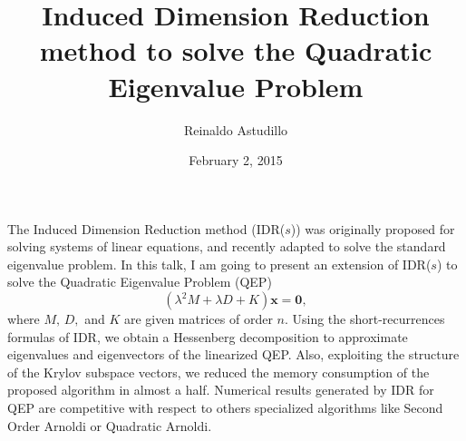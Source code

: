 \documentclass{article}
\title{Induced Dimension Reduction method to solve the Quadratic Eigenvalue Problem}
\author{Reinaldo Astudillo}
\affil{PhD student at TU Delft, The Netherlands}
\date{February 2, 2015}
\newcommand{\vv}[1]{\mathbf{#1}}
\begin{document}
\maketitle
\setcounter{page}{13}
    The Induced Dimension Reduction method (IDR($s$)) was
    originally proposed for solving systems of linear equations, and recently adapted 
    to solve the standard eigenvalue problem. In this talk,  I am going to present an extension of IDR($s$) to solve the Quadratic Eigenvalue Problem (QEP) 
    $$(\lambda^2 M + \lambda D + K)\vv{x} = \vv{0},$$
    where $M,\, D,$ and $K$ are given matrices of order $n$. Using the short-recurrences formulas of IDR, we obtain a Hessenberg decomposition to approximate eigenvalues and eigenvectors 
    of the linearized QEP. Also, exploiting the structure of the Krylov subspace vectors, we reduced the memory consumption of the proposed algorithm in almost a half.
    Numerical results generated by IDR for QEP  are competitive with respect to others specialized algorithms  
    like Second Order Arnoldi or Quadratic Arnoldi.
\end{document}
